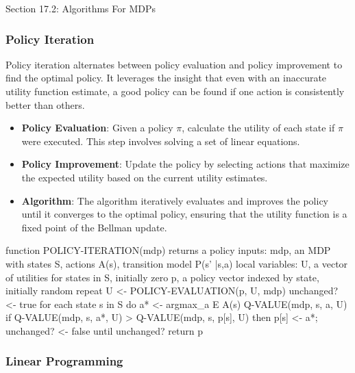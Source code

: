 \begin{notes}{Section 17.2: Algorithms For MDPs}
    \subsubsection*{Policy Iteration}
    
    Policy iteration alternates between policy evaluation and policy improvement to find the optimal policy. It leverages the insight that even with an inaccurate utility function estimate, a good 
    policy can be found if one action is consistently better than others.
    
    \begin{highlight}
    
        \begin{itemize}
            \item \textbf{Policy Evaluation}: Given a policy \(\pi\), calculate the utility of each state if \(\pi\) were executed. This step involves solving a set of linear equations.
            \item \textbf{Policy Improvement}: Update the policy by selecting actions that maximize the expected utility based on the current utility estimates.
            \item \textbf{Algorithm}: The algorithm iteratively evaluates and improves the policy until it converges to the optimal policy, ensuring that the utility function is a fixed point of the Bellman update.
        \end{itemize}
    
    \begin{code}[Pseudo]
    function POLICY-ITERATION(mdp) returns a policy
        inputs: mdp, an MDP with states S, actions A(s), transition model P(s' |s,a)
        local variables: U, a vector of utilities for states in S, initially zero
                        p, a policy vector indexed by state, initially random
        repeat
            U <- POLICY-EVALUATION(p, U, mdp)
            unchanged? <- true
            for each state s in S do
                a* <- argmax_{a E A(s)} Q-VALUE(mdp, s, a, U)
                if Q-VALUE(mdp, s, a*, U) > Q-VALUE(mdp, s, p[s], U) then
                    p[s] <- a*; unchanged? <- false
        until unchanged?
        return p
    \end{code}

    \end{highlight}

    \subsubsection*{Linear Programming}
    

\end{notes}
